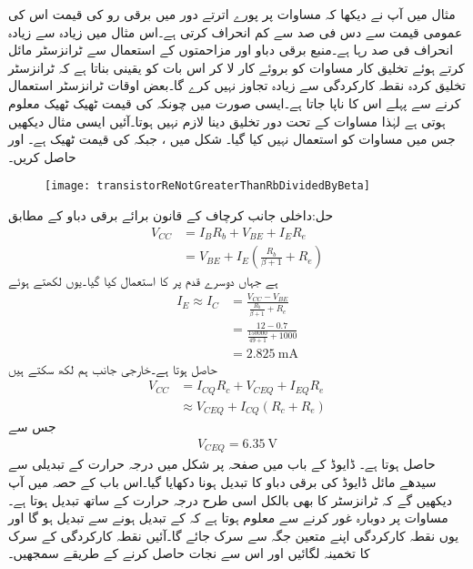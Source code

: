 مثال  میں آپ نے دیکھا کہ مساوات   پر پورے اترتے دور میں برقی رو کی قیمت اس کی عمومی قیمت سے دس فی صد سے کم انحراف کرتی ہے۔اس مثال میں زیادہ سے زیادہ انحراف   فی صد رہا ہے۔منبع برقی دباو اور مزاحمتوں کے استعمال سے ٹرانزسٹر مائل کرتے ہوئے تخلیق کار مساوات   کو بروئے کار لا کر اس بات کو یقینی بناتا ہے کہ ٹرانزسٹر تخلیق کردہ نقطہ کارکردگی سے زیادہ تجاوز نہیں کرے گا۔بعض اوقات ٹرانزسٹر استعمال کرنے سے پہلے اس کا  ناپا جاتا ہے۔ایسی صورت میں چونکہ  کی قیمت ٹھیک ٹھیک معلوم ہوتی ہے لہٰذا مساوات  کے تحت دور تخلیق دینا لازم نہیں ہوتا۔آئیں ایسی مثال دیکھیں جس میں مساوات  کو استعمال نہیں کیا گیا۔
شکل  میں  ،  جبکہ  کی قیمت ٹھیک  ہے۔ اور  حاصل کریں۔
\begin{figure}
\centering
\texttt{[image: transistorReNotGreaterThanRbDividedByBeta]}
\caption{}
\label{شکل_ٹرانزسٹر_بیٹا_ٹھیک_ٹھیک_معلوم}
\end{figure}

حل:داخلی جانب کرچاف کے قانون برائے برقی دباو کے مطابق
\begin{align*}
V_{CC}&=I_B R_b+V_{BE}+I_E R_e\\
&=V_{BE}+I_E \left(\frac{R_b}{\beta+1}+R_e \right)
\end{align*}
ہے جہاں دوسرے قدم پر  کا استعمال کیا گیا۔یوں  لکھتے ہوئے
\begin{align*}
I_E \approx I_C &= \frac{V_{CC}-V_{BE}}{\frac{R_b}{\beta+1}+R_e}\\
&=\frac{12-0.7}{\frac{150000}{49+1}+1000}\\
&=\SI{2.825}{\milli \ampere}
\end{align*}
حاصل ہوتا ہے۔خارجی جانب ہم لکھ سکتے  ہیں
\begin{align*}
V_{CC}&=I_{CQ} R_c+V_{CEQ}+I_{EQ} R_e\\
&\approx V_{CEQ}+I_{CQ} \left(R_c+R_e \right)
\end{align*}
جس سے
\begin{align*}
V_{CEQ}=\SI{6.35}{\volt}
\end{align*}
حاصل ہوتا ہے۔
  \label{حصہ_تبدیلی_برقی_دباو_سے_نکتہ_کارکردگی_کا_سرک_جانا}
ڈایوڈ کے باب میں صفحہ  \pageref{شکل_برقی_دباو_بالمقابل_حرارت}  پر شکل   میں درجہ حرارت کے تبدیلی سے سیدھے مائل ڈایوڈ کی برقی دباو   کا تبدیل ہونا دکھایا گیا۔اس باب کے حصہ  میں آپ دیکھیں گے کہ ٹرانزسٹر کا   بھی بالکل اسی طرح درجہ حرارت کے ساتھ تبدیل ہوتا ہے۔مساوات   پر دوبارہ غور کرنے سے معلوم ہوتا ہے کہ  کے تبدیل ہونے سے   تبدیل ہو گا اور یوں نقطہ کارکردگی اپنے متعین جگہ سے سرک جائے گا۔آئیں نقطہ کارکردگی کے سرک کا تخمینہ لگائیں اور اس سے نجات حاصل کرنے کے طریقے سمجھیں۔

